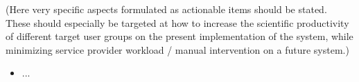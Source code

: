 (Here very specific aspects formulated as actionable items should be stated. These should especially be targeted at how to increase the scientific productivity of different target user groups on the present implementation of the system, while minimizing service provider workload / manual intervention on a future system.)

\begin{itemize}
  \item ...
\end{itemize}
